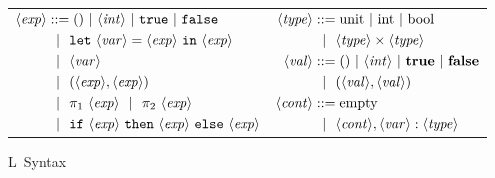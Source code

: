 \documentclass{article}
\newcommand {\coremono} {L}
\newcommand {\type} {\langle\mathit{type}\rangle}
\newcommand {\expr} {\langle\mathit{exp}\rangle}
\newcommand {\val} {\langle\mathit{val}\rangle}
\newcommand {\var} {\langle\mathit{var}\rangle}
\newcommand {\context} {\langle\mathit{cont}\rangle}
\newcommand {\inte} {\langle\mathit{int}\rangle}
\newcommand {\gbar} {~~|~~}
\newcommand {\letin} [3] {{\tt let}~{#1} = {#2}~{\tt in}~{#3}}
\newcommand {\ifthen} [3] {{\tt if}~{#1} ~{\tt then}~{#2}~{\tt else}~{#3}}
\newcommand {\valprod} [2] {{\bf (}{#1},{#2}{\bf )}}
\begin{document}
\begin{figure}
\caption{\coremono~Syntax}
\label{fig:baseSyntax}
\centering
\begin{tabular}{ll} 
$\begin{aligned}
\expr &::= ()~|~\inte~|~\mathtt{true}~|~\mathtt{false} \\
&\gbar \letin{\var}{\expr}{\expr} \\
&\gbar \var \\
&\gbar (\expr, \expr) \\
&\gbar \pi_1~\expr \gbar \pi_2~\expr \\
&\gbar \ifthen {\expr}{\expr}{\expr} 
\end{aligned} $
& 
$\begin{aligned}
\type &::=  \text{unit}~|~\text{int}~|~\text{bool} \\
&\gbar \type \times \type 
\\
\val &::= ()~|~\inte~|~\mathbf{true}~|~\mathbf{false} \\
&\gbar \valprod {\val} {\val} 
\\
\context &::= \mathrm{empty} \\
&\gbar \context, \var : \type
\end{aligned} $
\end{tabular}
\end{figure}
\end{document}
